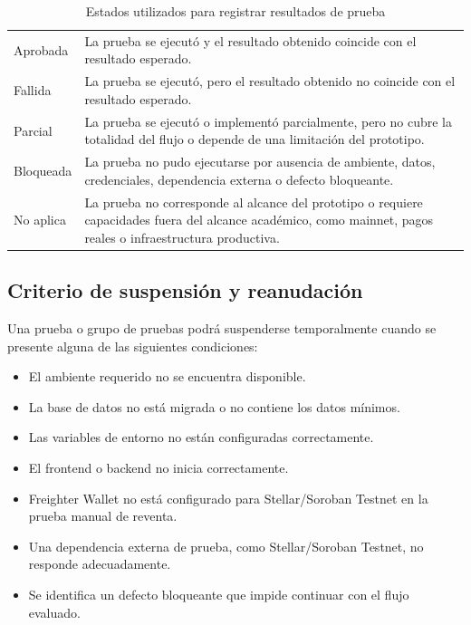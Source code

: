 \documentclass[12pt,letterpaper]{article}
\begin{document}
\begin{table}[H]
\centering
\begingroup
\scriptsize
\setlength{\tabcolsep}{3pt}
\renewcommand{\arraystretch}{1.22}

\begin{tabularx}{\textwidth}{|
>{\raggedright\arraybackslash}p{3.2cm}|
>{\raggedright\arraybackslash}X|}
\hline
\multicolumn{1}{|>{\centering\arraybackslash}m{3.2cm}|}{\textbf{Estado}} &
\multicolumn{1}{>{\centering\arraybackslash}m{11.1cm}|}{\textbf{Descripción}} \\
\hline

Aprobada &
La prueba se ejecutó y el resultado obtenido coincide con el resultado esperado. \\
\hline

Fallida &
La prueba se ejecutó, pero el resultado obtenido no coincide con el resultado esperado. \\
\hline

Parcial &
La prueba se ejecutó o implementó parcialmente, pero no cubre la totalidad del flujo o depende de una limitación del prototipo. \\
\hline

Bloqueada &
La prueba no pudo ejecutarse por ausencia de ambiente, datos, credenciales, dependencia externa o defecto bloqueante. \\
\hline

No aplica &
La prueba no corresponde al alcance del prototipo o requiere capacidades fuera del alcance académico, como mainnet, pagos reales o infraestructura productiva. \\
\hline

\end{tabularx}

\endgroup
\caption{Estados utilizados para registrar resultados de prueba}
\label{tab:estados-resultado-prueba}
\end{table}

\subsection{Criterio de suspensión y reanudación}

Una prueba o grupo de pruebas podrá suspenderse temporalmente cuando se presente alguna de las siguientes condiciones:

\begin{itemize}
    \item El ambiente requerido no se encuentra disponible.
    \item La base de datos no está migrada o no contiene los datos mínimos.
    \item Las variables de entorno no están configuradas correctamente.
    \item El frontend o backend no inicia correctamente.
    \item Freighter Wallet no está configurado para Stellar/Soroban Testnet en la prueba manual de reventa.
    \item Una dependencia externa de prueba, como Stellar/Soroban Testnet, no responde adecuadamente.
    \item Se identifica un defecto bloqueante que impide continuar con el flujo evaluado.
\end{itemize}
\end{document}
